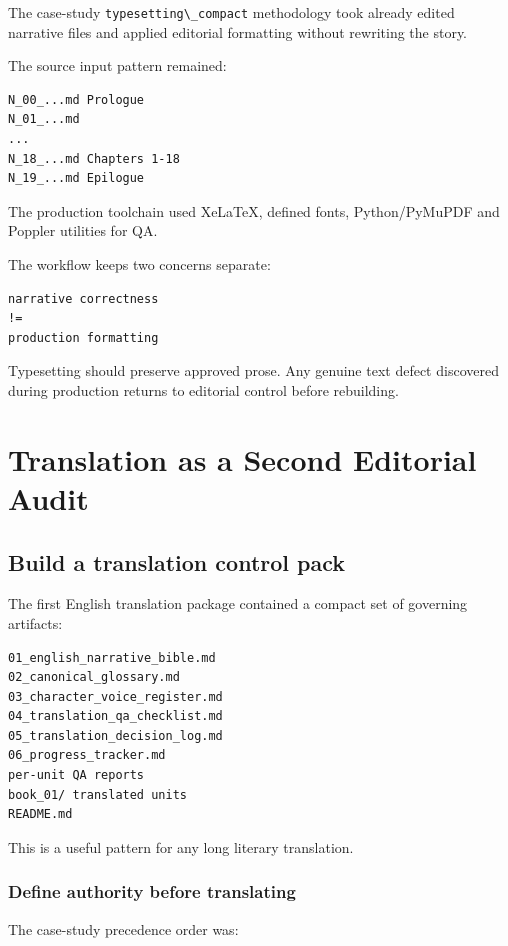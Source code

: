 \documentclass[11pt,oneside,openany]{book}
\newcommand{\passthrough}[1]{#1}
\begin{document}
The case-study \passthrough{\lstinline!typesetting\_compact!} methodology took already edited narrative files and applied editorial formatting without rewriting the story.

The source input pattern remained:

\begin{lstlisting}
N_00_...md Prologue
N_01_...md
...
N_18_...md Chapters 1-18
N_19_...md Epilogue
\end{lstlisting}

The production toolchain used XeLaTeX, defined fonts, Python/PyMuPDF and Poppler utilities for QA.

The workflow keeps two concerns separate:

\begin{lstlisting}
narrative correctness
!=
production formatting
\end{lstlisting}

Typesetting should preserve approved prose. Any genuine text defect discovered during production returns to editorial control before rebuilding.

\part{Translation as a Second Editorial Audit}

\chapter{Build a translation control pack}\label{build-a-translation-control-pack}

The first English translation package contained a compact set of governing artifacts:

\begin{lstlisting}
01_english_narrative_bible.md
02_canonical_glossary.md
03_character_voice_register.md
04_translation_qa_checklist.md
05_translation_decision_log.md
06_progress_tracker.md
per-unit QA reports
book_01/ translated units
README.md
\end{lstlisting}

This is a useful pattern for any long literary translation.

\section{Define authority before translating}\label{define-authority-before-translating}

The case-study precedence order was:
\end{document}
